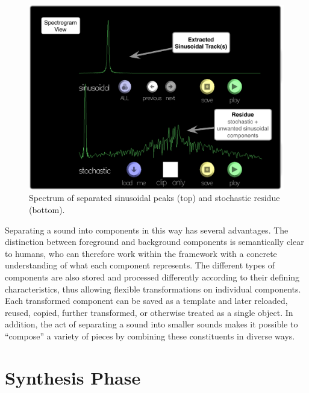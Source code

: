 \documentclass[10pt,letterpaper]{article}
\begin{document}
\begin{figure}[h]
  \begin{center}
    \includegraphics[width=.95\columnwidth]{ui_separate.pdf}
    \caption{Spectrum of separated sinusoidal peaks (top) and stochastic residue (bottom).} 
    \label{fig:ui_separate}
  \end{center}
\end{figure}

Separating a sound into components in this way has several
advantages. The distinction between foreground and background
components is semantically clear to humans, who can
therefore work within the framework with a concrete understanding
of what each component represents. The different
types of components are also stored and processed differently
according to their defining characteristics, thus allowing
flexible transformations on individual components. Each
transformed component can be saved as a template and later
reloaded, reused, copied, further transformed, or otherwise
treated as a single object. In addition, the act of separating a
sound into smaller sounds makes it possible to ``compose'' a
variety of pieces by combining these constituents in diverse
ways.

\section{Synthesis Phase}
\end{document}
